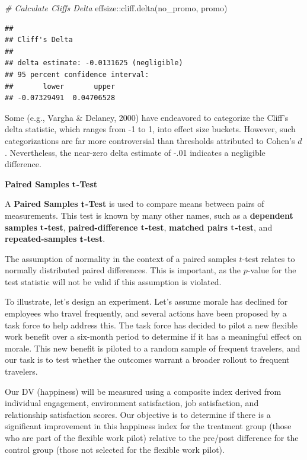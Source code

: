 \documentclass[
]{book}
\newenvironment{Shaded}{\begin{snugshade}}{\end{snugshade}}
\newcommand{\CommentTok}[1]{\textcolor[rgb]{0.56,0.35,0.01}{\textit{#1}}}
\newcommand{\FunctionTok}[1]{\textcolor[rgb]{0.00,0.00,0.00}{#1}}
\newcommand{\NormalTok}[1]{#1}
\newcommand{\SpecialCharTok}[1]{\textcolor[rgb]{0.00,0.00,0.00}{#1}}
\begin{document}
\begin{Shaded}
\begin{Highlighting}[]
\CommentTok{\# Calculate Cliff\textquotesingle{}s Delta}
\NormalTok{effsize}\SpecialCharTok{::}\FunctionTok{cliff.delta}\NormalTok{(no\_promo, promo)}
\end{Highlighting}
\end{Shaded}

\begin{verbatim}
## 
## Cliff's Delta
## 
## delta estimate: -0.0131625 (negligible)
## 95 percent confidence interval:
##       lower       upper 
## -0.07329491  0.04706528
\end{verbatim}

Some (e.g., Vargha \& Delaney, 2000) have endeavored to categorize the Cliff's delta statistic, which ranges from -1 to 1, into effect size buckets. However, such categorizations are far more controversial than thresholds attributed to Cohen's \(d\). Nevertheless, the near-zero delta estimate of -.01 indicates a negligible difference.

\textbf{Paired Samples} \(\textbf t\)\textbf{-Test}

A \textbf{Paired Samples }\(\textbf t\)\textbf{-Test} is used to compare means between pairs of measurements. This test is known by many other names, such as a \textbf{dependent samples} \(\textbf t\)\textbf{-test}, \textbf{paired-difference} \(\textbf t\)\textbf{-test}, \textbf{matched pairs} \(\textbf t\)\textbf{-test}, and \textbf{repeated-samples} \(\textbf t\)\textbf{-test}.

The assumption of normality in the context of a paired samples \(t\)-test relates to normally distributed paired differences. This is important, as the \(p\)-value for the test statistic will not be valid if this assumption is violated.

To illustrate, let's design an experiment. Let's assume morale has declined for employees who travel frequently, and several actions have been proposed by a task force to help address this. The task force has decided to pilot a new flexible work benefit over a six-month period to determine if it has a meaningful effect on morale. This new benefit is piloted to a random sample of frequent travelers, and our task is to test whether the outcomes warrant a broader rollout to frequent travelers.

Our DV (happiness) will be measured using a composite index derived from individual engagement, environment satisfaction, job satisfaction, and relationship satisfaction scores. Our objective is to determine if there is a significant improvement in this happiness index for the treatment group (those who are part of the flexible work pilot) relative to the pre/post difference for the control group (those not selected for the flexible work pilot).
\end{document}

